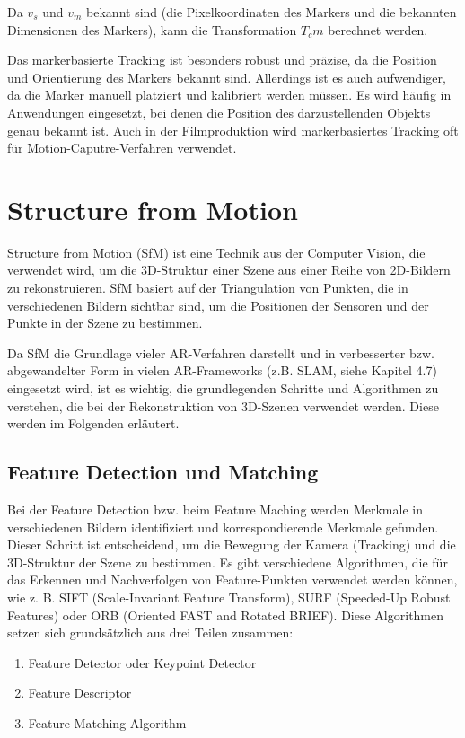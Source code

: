 Da \(v_s\) und \(v_m\) bekannt sind (die Pixelkoordinaten des Markers und die bekannten Dimensionen des Markers), kann die Transformation \(T_cm\) berechnet werden.

Das markerbasierte Tracking ist besonders robust und präzise, da die Position und Orientierung des Markers bekannt sind. Allerdings ist es auch aufwendiger, da die Marker manuell platziert und kalibriert werden müssen. Es wird häufig in Anwendungen eingesetzt, bei denen die Position des darzustellenden Objekts genau bekannt ist. Auch in der Filmproduktion wird markerbasiertes Tracking oft für Motion-Caputre-Verfahren verwendet.

\section{Structure from Motion}\label{SfM}

Structure from Motion (SfM) ist eine Technik aus der Computer Vision, die verwendet wird, um die 3D-Struktur einer Szene aus einer Reihe von 2D-Bildern zu rekonstruieren. SfM basiert auf der Triangulation von Punkten, die in verschiedenen Bildern sichtbar sind, um die Positionen der Sensoren und der Punkte in der Szene zu bestimmen.

Da SfM die Grundlage vieler AR-Verfahren darstellt und in verbesserter bzw. abgewandelter Form in vielen AR-Frameworks (z.B. SLAM, siehe Kapitel 4.7) eingesetzt wird, ist es wichtig, die grundlegenden Schritte und Algorithmen zu verstehen, die bei der Rekonstruktion von 3D-Szenen verwendet werden. Diese werden im Folgenden erläutert.

\subsection{Feature Detection und Matching}

Bei der Feature Detection bzw. beim Feature Maching werden Merkmale in verschiedenen Bildern identifiziert und korrespondierende Merkmale gefunden. Dieser Schritt ist entscheidend, um die Bewegung der Kamera (Tracking) und die 3D-Struktur der Szene zu bestimmen. Es gibt verschiedene Algorithmen, die für das Erkennen und Nachverfolgen von Feature-Punkten verwendet werden können, wie z. B. SIFT (Scale-Invariant Feature Transform), SURF (Speeded-Up Robust Features) oder ORB (Oriented FAST and Rotated BRIEF). Diese Algorithmen setzen sich grundsätzlich aus drei Teilen zusammen:

\begin{enumerate}
    \item Feature Detector oder Keypoint Detector
    \item Feature Descriptor
    \item Feature Matching Algorithm
\end{enumerate}

